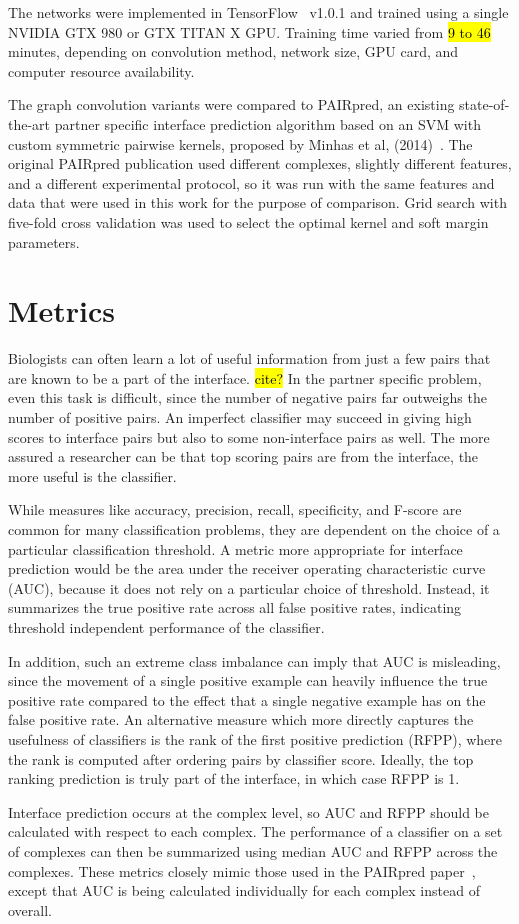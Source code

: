 The networks were implemented in TensorFlow~\cite{abadi2015} v1.0.1 and trained using a single NVIDIA GTX 980 or GTX TITAN X GPU.
Training time varied from \hl{9 to 46} minutes, depending on convolution method, network size, GPU card, and computer resource availability.


The graph convolution variants were compared to PAIRpred, an existing state-of-the-art partner specific interface prediction algorithm based on an SVM with custom symmetric pairwise kernels, proposed by Minhas et al, (2014)~\cite{minhas2014}.
The original PAIRpred publication used different complexes, slightly different features, and a different experimental protocol, so it was run with the same features and data that were used in this work for the purpose of comparison.
Grid search with five-fold cross validation was used to select the optimal kernel and soft margin parameters.



\section{Metrics}

Biologists can often learn a lot of useful information from just a few pairs that are known to be a part of the interface. \hl{cite?}
In the partner specific problem, even this task is difficult, since the number of negative pairs far outweighs the number of positive pairs.
An imperfect classifier may succeed in giving high scores to interface pairs but also to some non-interface pairs as well.
The more assured a researcher can be that top scoring pairs are from the interface, the more useful is the classifier.

While measures like accuracy, precision, recall, specificity, and F-score are common for many classification problems, they are dependent on the choice of a particular classification threshold.
A metric more appropriate for interface prediction would be the area under the receiver operating characteristic curve (AUC), because it does not rely on a particular choice of threshold.
Instead, it summarizes the true positive rate across all false positive rates, indicating threshold independent performance of the classifier.

In addition, such an extreme class imbalance can imply that AUC is misleading, since the movement of a single positive example can heavily influence the true positive rate compared to the effect that a single negative example has on the false positive rate.
An alternative measure which more directly captures the usefulness of classifiers is the rank of the first positive prediction (RFPP), where the rank is computed after ordering pairs by classifier score.
Ideally, the top ranking prediction is truly part of the interface, in which case RFPP is 1.

Interface prediction occurs at the complex level, so AUC and RFPP should be calculated with respect to each complex. 
The performance of a classifier on a set of complexes can then be summarized using median AUC and RFPP across the complexes.
These metrics closely mimic those used in the PAIRpred paper~\cite{minhas2014}, except that AUC is being calculated individually for each complex instead of overall.
